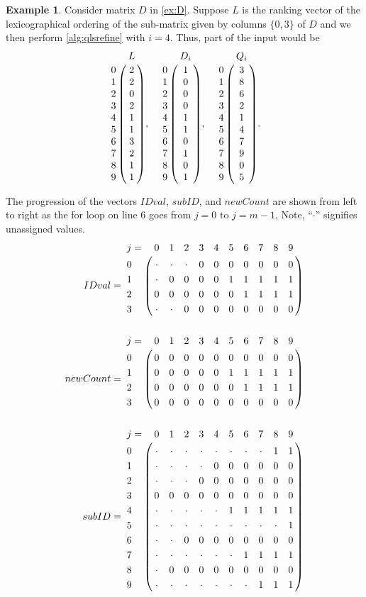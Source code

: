 \documentclass[a4paper,10pt,reqno]{amsart}
\theoremstyle{definition}
\newtheorem{example}{Example}
\begin{document}
\begin{example}
Consider matrix $D$ in \autoref{ex:D}. Suppose $L$ is the ranking vector of the
lexicographical ordering of the sub-matrix given by columns $\{0,3\}$ of $D$
and we then perform \autoref{alg:qlsrefine} with $i=4$. Thus, part of the input would be 
\begin{equation*}
\bordermatrix{
  & L\cr 
0 & 2\cr
1 & 2\cr
2 & 0\cr
3 & 2\cr
4 & 1\cr
5 & 1\cr
6 & 3\cr
7 & 2\cr
8 & 1\cr
9 & 1}, \quad
\bordermatrix{
  & D_i\cr
0 & 1\cr
1 & 0\cr
2 & 0\cr
3 & 0\cr
4 & 1\cr
5 & 1\cr
6 & 0\cr
7 & 1\cr
8 & 0\cr
9 & 1}, \quad
\bordermatrix{
  & Q_i\cr
0 & 3\cr
1 & 8\cr
2 & 6\cr
3 & 2\cr
4 & 1\cr
5 & 4\cr
6 & 7\cr
7 & 9\cr
8 & 0\cr
9 & 5}.
\end{equation*}

The progression of the vectors $IDval$, $subID$, and $newCount$ are shown from
left to right as the for loop on line 6 goes from $j=0$ to $j=m-1$, Note, ``$\cdot$''
signifies unassigned values.
\begin{align*}
    IDval &= 
\bordermatrix{
j=  &  0      &  1      &  2      &  3  &  4  &  5  &  6  &  7  &  8  &  9  \cr
0   &  \cdot  &  \cdot  &  \cdot  &  0  &  0  &  0  &  0  &  0  &  0  &  0  \cr
1   &  \cdot  &  0      &  0      &  0  &  0  &  1  &  1  &  1  &  1  &  1  \cr
2   &  0      &  0      &  0      &  0  &  0  &  0  &  1  &  1  &  1  &  1  \cr
3   &  \cdot  &  \cdot  &  0      &  0  &  0  &  0  &  0  &  0  &  0  &  0  }\\
\phantom{A}\\
newCount &= 
\bordermatrix{
j=  &  0  &  1  &  2  &  3  &  4  &  5  &  6  &  7  &  8  &  9  \cr
0   &  0  &  0  &  0  &  0  &  0  &  0  &  0  &  0  &  0  &  0  \cr
1   &  0  &  0  &  0  &  0  &  0  &  1  &  1  &  1  &  1  &  1  \cr
2   &  0  &  0  &  0  &  0  &  0  &  0  &  1  &  1  &  1  &  1  \cr
3   &  0  &  0  &  0  &  0  &  0  &  0  &  0  &  0  &  0  &  0  }\\
\phantom{A}\\
subID &= 
\bordermatrix{
j=  &  0      &  1      &  2      &  3      &  4      &  5      &  6      &  7      &  8      &  9  \cr
0   &  \cdot  &  \cdot  &  \cdot  &  \cdot  &  \cdot  &  \cdot  &  \cdot  &  \cdot  &  1      &  1  \cr
1   &  \cdot  &  \cdot  &  \cdot  &  \cdot  &  0      &  0      &  0      &  0      &  0      &  0  \cr
2   &  \cdot  &  \cdot  &  \cdot  &  0      &  0      &  0      &  0      &  0      &  0      &  0  \cr
3   &  0      &  0      &  0      &  0      &  0      &  0      &  0      &  0      &  0      &  0  \cr
4   &  \cdot  &  \cdot  &  \cdot  &  \cdot  &  \cdot  &  1      &  1      &  1      &  1      &  1  \cr
5   &  \cdot  &  \cdot  &  \cdot  &  \cdot  &  \cdot  &  \cdot  &  \cdot  &  \cdot  &  \cdot  &  1  \cr
6   &  \cdot  &  \cdot  &  0      &  0      &  0      &  0      &  0      &  0      &  0      &  0  \cr
7   &  \cdot  &  \cdot  &  \cdot  &  \cdot  &  \cdot  &  \cdot  &  1      &  1      &  1      &  1  \cr
8   &  \cdot  &  0      &  0      &  0      &  0      &  0      &  0      &  0      &  0      &  0  \cr
9   &  \cdot  &  \cdot  &  \cdot  &  \cdot  &  \cdot  &  \cdot  &  \cdot  &  1      &  1      &  1  }
\end{align*}



\end{example}
\end{document}
